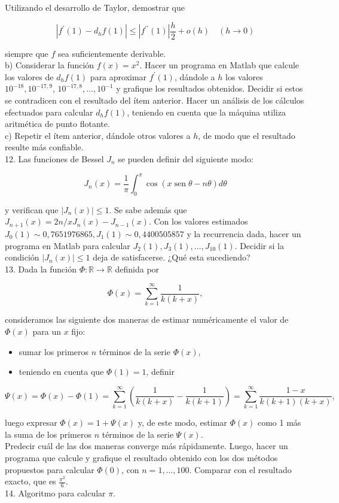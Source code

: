 \documentclass[10pt]{article}
\begin{document}
Utilizando el desarrollo de Taylor, demostrar que

$$
\left|f^{\prime}(1)-d_{h} f(1)\right| \leq\left|f^{\prime \prime}(1)\right| \frac{h}{2}+o(h) \quad(h \rightarrow 0)
$$

siempre que $f$ sea suficientemente derivable.\\
b) Considerar la función $f(x)=x^{2}$. Hacer un programa en Matlab que calcule los valores de $d_{h} f(1)$ para aproximar $f^{\prime}(1)$, dándole a $h$ los valores $10^{-18}, 10^{-17,9}$, $10^{-17,8}, \ldots, 10^{-1}$ y grafique los resultados obtenidos. Decidir si estos se contradicen con el resultado del ítem anterior. Hacer un análisis de los cálculos efectuados para calcular $d_{h} f(1)$, teniendo en cuenta que la máquina utiliza aritmética de punto flotante.\\
c) Repetir el ítem anterior, dándole otros valores a $h$, de modo que el resultado resulte más confiable.\\
12. Las funciones de Bessel $J_{n}$ se pueden definir del siguiente modo:

$$
J_{n}(x)=\frac{1}{\pi} \int_{0}^{\pi} \cos (x \operatorname{sen} \theta-n \theta) d \theta
$$

y verifican que $\left|J_{n}(x)\right| \leq 1$. Se sabe además que $J_{n+1}(x)=2 n / x J_{n}(x)-J_{n-1}(x)$. Con los valores estimados $J_{0}(1) \sim 0,7651976865, J_{1}(1) \sim 0,4400505857$ y la recurrencia dada, hacer un programa en Matlab para calcular $J_{2}(1), J_{3}(1), \ldots, J_{10}(1)$. Decidir si la condición $\left|J_{n}(x)\right| \leq 1$ deja de satisfacerse. ¿Qué esta sucediendo?\\
13. Dada la función $\Phi: \mathbb{R} \rightarrow \mathbb{R}$ definida por

$$
\Phi(x)=\sum_{k=1}^{\infty} \frac{1}{k(k+x)},
$$

consideramos las siguiente dos maneras de estimar numéricamente el valor de $\Phi(x)$ para un $x$ fijo:

\begin{itemize}
  \item sumar los primeros $n$ términos de la serie $\Phi(x)$,
  \item teniendo en cuenta que $\Phi(1)=1$, definir
\end{itemize}

$$
\Psi(x)=\Phi(x)-\Phi(1)=\sum_{k=1}^{\infty}\left(\frac{1}{k(k+x)}-\frac{1}{k(k+1)}\right)=\sum_{k=1}^{\infty} \frac{1-x}{k(k+1)(k+x)},
$$

luego expresar $\Phi(x)=1+\Psi(x)$ y, de este modo, estimar $\Phi(x)$ como 1 más la suma de los primeros $n$ términos de la serie $\Psi(x)$.\\
Predecir cuál de las dos maneras converge más rápidamente. Luego, hacer un programa que calcule y grafique el resultado obtenido con los dos métodos propuestos para calcular $\Phi(0)$, con $n=1, \ldots, 100$. Comparar con el resultado exacto, que es $\frac{\pi^{2}}{6}$.\\
14. Algoritmo para calcular $\pi$.
\end{document}
